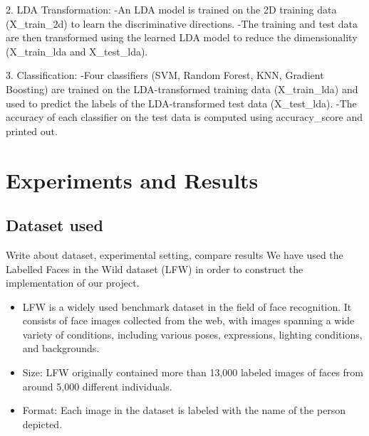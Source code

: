 \documentclass[a4paper]{article}
\theoremstyle{plain}
\theoremstyle{definition}
\begin{document}
       2. LDA Transformation:\newline
    \hspace{10cm}-An LDA model is trained on the 2D training data (X\_train\_2d) to learn the discriminative directions.\newline
    \hspace{10cm}-The training and test data are then transformed using the learned LDA model to reduce the dimensionality (X\_train\_lda and X\_test\_lda).\newline

      3. Classification:\newline
      \hspace{10cm}-Four classifiers (SVM, Random Forest, KNN, Gradient Boosting) are trained on the LDA-transformed training data (X\_train\_lda) and used to predict the labels of the LDA-transformed test data (X\_test\_lda).\newline
      \hspace{10cm}-The accuracy of each classifier on the test data is computed using accuracy\_score and printed out.\newline
 
\vspace{50pt}

	
	\section{Experiments and Results}

 
 
 \label{sec:app}

\subsection{ Dataset used }
	Write about dataset, experimental setting, compare results
 \newline
 We have used the Labelled Faces in the Wild dataset (LFW) in order to construct the  implementation of our project. 
 \newline
 
\begin{itemize}
    \item LFW is a widely used benchmark dataset in the field of face recognition. It consists of face images collected from the web, with images spanning a wide variety of conditions, including various poses, expressions, lighting conditions, and backgrounds.
    \item Size: LFW originally contained more than 13,000 labeled images of faces from around 5,000 different individuals.
    \item Format: Each image in the dataset is labeled with the name of the person depicted.
\end{itemize}
 
\end{document}
